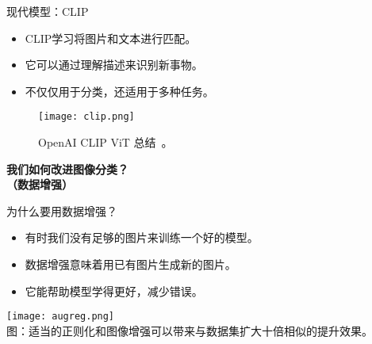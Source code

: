 \begin{refsection}
\begin{frame}{现代模型：CLIP}
  \begin{itemize}
    \item CLIP学习将图片和文本进行匹配。
    \item 它可以通过理解描述来识别新事物。
    \item 不仅仅用于分类，还适用于多种任务。
  \end{itemize}
  \centering
  \begin{figure}
    \centering
    \texttt{[image: clip.png]}
    \caption[]{\scriptsize OpenAI CLIP ViT 总结~\parencite{radfordLearningTransferableVisual2021}。}
  \end{figure}
  \bottomleftrefs
\end{frame}
\end{refsection}



\begin{refsection}
\begin{frame}
  \centering
  \vspace{2.5cm}
  {\LARGE \textbf{我们如何改进图像分类？}\\[0.5em]
  \textbf{（数据增强）}}
\end{frame}
\end{refsection}

\begin{refsection}
\begin{frame}{为什么要用数据增强？}
  \begin{minipage}{0.48\linewidth}
    \begin{itemize}
      \item 有时我们没有足够的图片来训练一个好的模型。
      \item 数据增强意味着用已有图片生成新的图片。
      \item 它能帮助模型学得更好，减少错误。
    \end{itemize}
  \end{minipage}%
  \hfill
  \begin{minipage}{0.48\linewidth}
    \centering
    \texttt{[image: augreg.png]}
    \scriptsize \\
    图：适当的正则化和图像增强可以带来与数据集扩大十倍相似的提升效果。~\parencite{steinerHowTrainYour2022}
  \end{minipage}
  \bottomleftrefs
\end{frame}
\end{refsection}

